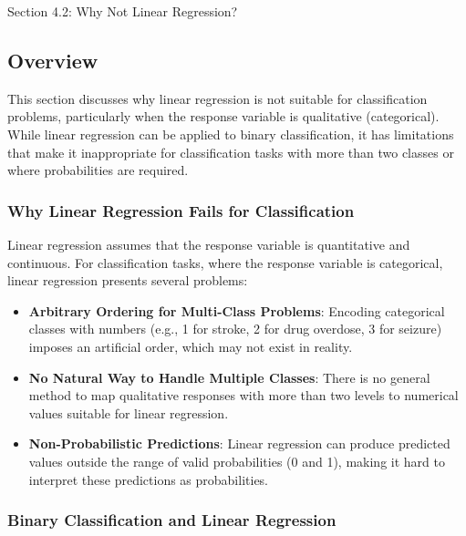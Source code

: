 \begin{notes}{Section 4.2: Why Not Linear Regression?}
    \subsection*{Overview}

    This section discusses why linear regression is not suitable for classification problems, particularly when the response variable is qualitative (categorical). While linear regression can be applied 
    to binary classification, it has limitations that make it inappropriate for classification tasks with more than two classes or where probabilities are required.
    
    \subsubsection*{Why Linear Regression Fails for Classification}
    
    Linear regression assumes that the response variable is quantitative and continuous. For classification tasks, where the response variable is categorical, linear regression presents several problems:
    
    \begin{highlight}
        \begin{itemize}
            \item \textbf{Arbitrary Ordering for Multi-Class Problems}: Encoding categorical classes with numbers (e.g., 1 for stroke, 2 for drug overdose, 3 for seizure) imposes an artificial order, 
            which may not exist in reality.
            \item \textbf{No Natural Way to Handle Multiple Classes}: There is no general method to map qualitative responses with more than two levels to numerical values suitable for linear regression.
            \item \textbf{Non-Probabilistic Predictions}: Linear regression can produce predicted values outside the range of valid probabilities (0 and 1), making it hard to interpret these predictions as probabilities.
        \end{itemize}
    \end{highlight}
    
    \subsubsection*{Binary Classification and Linear Regression}
    

\end{notes}
